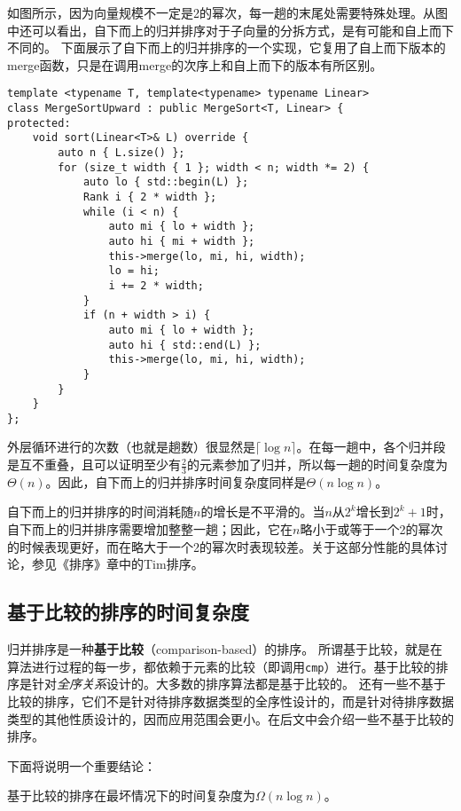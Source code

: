如图所示，因为向量规模不一定是2的幂次，每一趟的末尾处需要特殊处理。从图中还可以看出，自下而上的归并排序对于子向量的分拆方式，是有可能和自上而下不同的。
下面展示了自下而上的归并排序的一个实现，它复用了自上而下版本的merge函数，只是在调用merge的次序上和自上而下的版本有所区别。

\begin{lstlisting}
template <typename T, template<typename> typename Linear>
class MergeSortUpward : public MergeSort<T, Linear> {
protected:
    void sort(Linear<T>& L) override {
        auto n { L.size() };
        for (size_t width { 1 }; width < n; width *= 2) {
            auto lo { std::begin(L) };
            Rank i { 2 * width };
            while (i < n) {
                auto mi { lo + width };
                auto hi { mi + width };
                this->merge(lo, mi, hi, width);
                lo = hi;
                i += 2 * width;
            }
            if (n + width > i) {
                auto mi { lo + width };
                auto hi { std::end(L) };
                this->merge(lo, mi, hi, width);
            }
        }
    }
};
\end{lstlisting}

外层循环进行的次数（也就是趟数）很显然是$\lceil \log n\rceil$。在每一趟中，各个归并段是互不重叠，且可以证明至少有$\frac{2}{3}$的元素参加了归并，所以每一趟的时间复杂度为$\Theta(n)$。因此，自下而上的归并排序时间复杂度同样是$\Theta(n\log n)$。

自下而上的归并排序的时间消耗随$n$的增长是不平滑的。当$n$从$2^k$增长到$2^k+1$时，自下而上的归并排序需要增加整整一趟；因此，它在$n$略小于或等于一个2的幂次的时候表现更好，而在略大于一个2的幂次时表现较差。关于这部分性能的具体讨论，参见《排序》章中的Tim排序。

\subsection{基于比较的排序的时间复杂度}
\label{vec:基于比较的排序的时间复杂度}
归并排序是一种\textbf{基于比较}（comparison-based）的排序。
所谓基于比较，就是在算法进行过程的每一步，都依赖于元素的比较（即调用\lstinline{cmp}）进行。基于比较的排序是针对\textit{全序关系}设计的。大多数的排序算法都是基于比较的。
还有一些不基于比较的排序，它们不是针对待排序数据类型的全序性设计的，而是针对待排序数据类型的其他性质设计的，因而应用范围会更小。在后文中会介绍一些不基于比较的排序。

下面将说明一个重要结论：
\begin{theorem}
基于比较的排序在最坏情况下的时间复杂度为$\Omega(n\log n)$。
\end{theorem}

